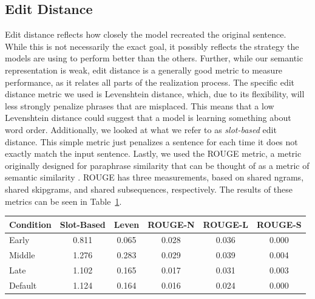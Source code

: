 \subsection{Edit Distance}
Edit distance reflects how closely the model recreated the original sentence. While this is not necessarily the exact goal, it possibly reflects the strategy the models are using to perform better than the others. Further, while our semantic representation is weak, edit distance is a generally good metric to measure performance, as it relates all parts of the realization process. The specific edit distance metric we used is Levenshtein distance, which, due to its flexibility, will less strongly penalize phrases that are misplaced. This means that a low Levenshtein distance could suggest that a model is learning something about word order. Additionally, we looked at what we refer to as \textit{slot-based} edit distance. This simple metric just penalizes a sentence for each time it does not exactly match the input sentence. Lastly, we used the ROUGE metric, a metric originally designed for paraphrase similarity that can be thought of as a metric of semantic similarity \citep{rouge}. ROUGE has three measurements, based on shared ngrams, shared skipgrams, and shared subsequences, respectively. The results of these metrics can be seen in Table~\ref{distance}. 

\begin{table}
\centering
\begin{tabular}{l|ccccc}
Condition & Slot-Based & Leven & ROUGE-N & ROUGE-L & ROUGE-S  \\ \hline
Early & 0.811 & 0.065 & 0.028 & 0.036 & 0.000 \\
Middle & 1.276 & 0.283 & 0.029 & 0.039 & 0.004 \\
Late & 1.102 & 0.165 & 0.017 & 0.031 & 0.003 \\
Default & 1.124 & 0.164 & 0.016 & 0.024 & 0.000 \\
\end{tabular}
\label{distance}
\end{table}